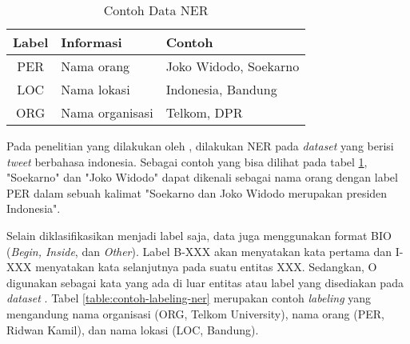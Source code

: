 \begin{table}[h]
    \vspace{0.25cm}
    \caption{Contoh Data NER \parencite{ner}}
    \label{table:contoh-data-ner}
    \begin{center}
        \begin{tabular}{cll}
            \hline
            \textbf{Label} & \textbf{Informasi} & \textbf{Contoh} \\ \hline
            PER & Nama orang & Joko Widodo, Soekarno \\ \hline
            LOC & Nama lokasi & Indonesia, Bandung \\ \hline
            ORG & Nama organisasi & Telkom, DPR \\ \hline
        \end{tabular}
    \end{center}
\end{table}

Pada penelitian yang dilakukan oleh \citeauthor{ner}, dilakukan NER pada \textit{dataset} yang berisi \textit{tweet} berbahasa indonesia. Sebagai contoh yang bisa dilihat pada tabel \ref{table:contoh-data-ner}, "Soekarno" dan "Joko Widodo" dapat dikenali sebagai nama orang dengan label PER dalam sebuah kalimat "Soekarno dan Joko Widodo merupakan presiden Indonesia". 

Selain diklasifikasikan menjadi label saja, data juga menggunakan format BIO (\textit{Begin, Inside}, dan \textit{Other}). Label B-XXX akan menyatakan kata pertama dan I-XXX menyatakan kata selanjutnya pada suatu entitas XXX. Sedangkan, O digunakan sebagai kata yang ada di luar entitas atau label yang disediakan pada \textit{dataset} \parencite{ner}. Tabel \ref{table:contoh-labeling-ner} merupakan contoh \textit{labeling} yang mengandung nama organisasi (ORG, Telkom University), nama orang (PER, Ridwan Kamil), dan nama lokasi (LOC, Bandung).

